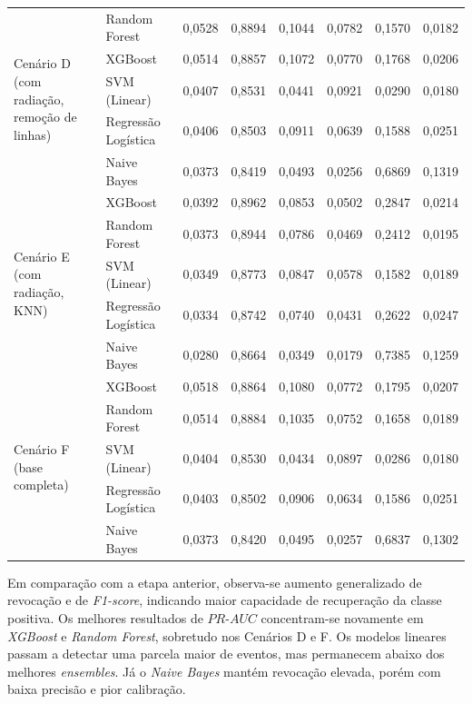 \begin{longtable}{p{3.2cm} l c c c c c c}
\multirow{5}{*}{\parbox{3.2cm}{\centering Cenário D\\(com radiação, remoção de linhas)}} 
   & Random Forest       & 0,0528 & 0,8894 & 0,1044 & 0,0782 & 0,1570 & 0,0182 \\
   & XGBoost             & 0,0514 & 0,8857 & 0,1072 & 0,0770 & 0,1768 & 0,0206 \\
   & SVM (Linear)        & 0,0407 & 0,8531 & 0,0441 & 0,0921 & 0,0290 & 0,0180 \\
   & Regressão Logística & 0,0406 & 0,8503 & 0,0911 & 0,0639 & 0,1588 & 0,0251 \\
   & Naive Bayes         & 0,0373 & 0,8419 & 0,0493 & 0,0256 & 0,6869 & 0,1319 \\
\midrule

\multirow{5}{*}{\parbox{3.2cm}{\centering Cenário E\\(com radiação, KNN)}} 
   & XGBoost             & 0,0392 & 0,8962 & 0,0853 & 0,0502 & 0,2847 & 0,0214 \\
   & Random Forest       & 0,0373 & 0,8944 & 0,0786 & 0,0469 & 0,2412 & 0,0195 \\
   & SVM (Linear)        & 0,0349 & 0,8773 & 0,0847 & 0,0578 & 0,1582 & 0,0189 \\
   & Regressão Logística & 0,0334 & 0,8742 & 0,0740 & 0,0431 & 0,2622 & 0,0247 \\
   & Naive Bayes         & 0,0280 & 0,8664 & 0,0349 & 0,0179 & 0,7385 & 0,1259 \\
\midrule

\multirow{5}{*}{\parbox{3.2cm}{\centering Cenário F\\(base completa)}} 
   & XGBoost             & 0,0518 & 0,8864 & 0,1080 & 0,0772 & 0,1795 & 0,0207 \\
   & Random Forest       & 0,0514 & 0,8884 & 0,1035 & 0,0752 & 0,1658 & 0,0189 \\
   & SVM (Linear)        & 0,0404 & 0,8530 & 0,0434 & 0,0897 & 0,0286 & 0,0180 \\
   & Regressão Logística & 0,0403 & 0,8502 & 0,0906 & 0,0634 & 0,1586 & 0,0251 \\
   & Naive Bayes         & 0,0373 & 0,8420 & 0,0495 & 0,0257 & 0,6837 & 0,1302 \\
\end{longtable}
\endgroup

Em comparação com a etapa anterior, observa-se aumento generalizado de revocação e de \textit{F1-score}, indicando maior capacidade de recuperação da classe positiva. Os melhores resultados de $PR\text{-}AUC$ concentram-se novamente em \textit{XGBoost} e \textit{Random Forest}, sobretudo nos Cenários D e F. Os modelos lineares passam a detectar uma parcela maior de eventos, mas permanecem abaixo dos melhores \textit{ensembles}. Já o \textit{Naive Bayes} mantém revocação elevada, porém com baixa precisão e pior calibração.

